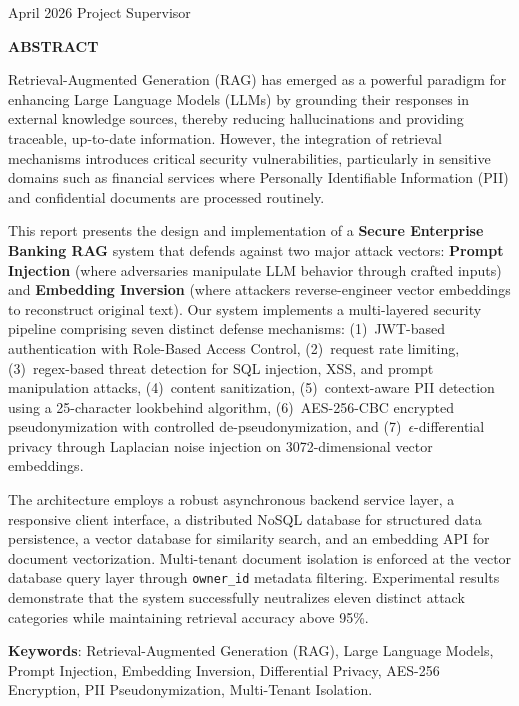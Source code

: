\documentclass[11pt,a4paper]{report}
\theoremstyle{plain}
\theoremstyle{definition}
\theoremstyle{remark}
\begin{document}
\noindent April 2026 \hfill Project Supervisor

\clearpage

\begin{center}
{\Large{\bf{ABSTRACT}}}
\end{center}

Retrieval-Augmented Generation (RAG) has emerged as a powerful paradigm for enhancing Large Language Models (LLMs) by grounding their responses in external knowledge sources, thereby reducing hallucinations and providing traceable, up-to-date information. However, the integration of retrieval mechanisms introduces critical security vulnerabilities, particularly in sensitive domains such as financial services where Personally Identifiable Information (PII) and confidential documents are processed routinely.

This report presents the design and implementation of a \textbf{Secure Enterprise Banking RAG} system that defends against two major attack vectors: \textbf{Prompt Injection} (where adversaries manipulate LLM behavior through crafted inputs) and \textbf{Embedding Inversion} (where attackers reverse-engineer vector embeddings to reconstruct original text). Our system implements a multi-layered security pipeline comprising seven distinct defense mechanisms: (1)~JWT-based authentication with Role-Based Access Control, (2)~request rate limiting, (3)~regex-based threat detection for SQL injection, XSS, and prompt manipulation attacks, (4)~content sanitization, (5)~context-aware PII detection using a 25-character lookbehind algorithm, (6)~AES-256-CBC encrypted pseudonymization with controlled de-pseudonymization, and (7)~$\epsilon$-differential privacy through Laplacian noise injection on 3072-dimensional vector embeddings.

The architecture employs a robust asynchronous backend service layer, a responsive client interface, a distributed NoSQL database for structured data persistence, a vector database for similarity search, and an embedding API for document vectorization. Multi-tenant document isolation is enforced at the vector database query layer through \texttt{owner\_id} metadata filtering. Experimental results demonstrate that the system successfully neutralizes eleven distinct attack categories while maintaining retrieval accuracy above 95\%.

\vspace{0.5cm}
\noindent\textbf{Keywords}: Retrieval-Augmented Generation (RAG), Large Language Models, Prompt Injection, Embedding Inversion, Differential Privacy, AES-256 Encryption, PII Pseudonymization, Multi-Tenant Isolation.

\clearpage

\tableofcontents
\clearpage
\listoffigures
\clearpage
\listoftables

\newpage
{}
\setcounter{page}{1}










\end{document}
